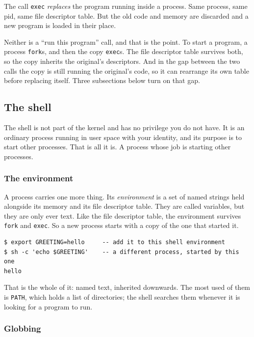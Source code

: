 \documentclass[11pt,a4paper]{article}
\begin{document}
The call \texttt{exec} \emph{replaces} the program running inside a process. Same process, same pid, same
file descriptor table. But the old code and memory are discarded and a new program is loaded in their
place.

Neither is a ``run this program'' call, and that is the point. To start a program, a process
\texttt{fork}s, and then the copy \texttt{exec}s. The file descriptor table survives both, so the copy
inherits the original's descriptors. And in the gap between the two calls the copy is still running
the original's code, so it can rearrange its own table before replacing itself. Three subsections
below turn on that gap.

\subsection{The shell}

The shell is not part of the kernel and has no privilege you do not have. It is an ordinary
process running in user space with your identity, and its purpose is to start other processes. That
is all it is. A process whose job is starting other processes.

\subsubsection{The environment}

A process carries one more thing. Its \emph{environment} is a set of named strings held
alongside its memory and its file descriptor table. They are called variables, but they are only ever
text. Like the file descriptor table, the environment survives \texttt{fork} and \texttt{exec}. So a new
process starts with a copy of the one that started it.

\begin{lstlisting}[language=SH]
$ export GREETING=hello     -- add it to this shell environment
$ sh -c 'echo $GREETING'    -- a different process, started by this one
hello
\end{lstlisting}

That is the whole of it: named text, inherited downwards. The most used of them is
\texttt{PATH}, which holds a list of directories; the shell searches them whenever it is
looking for a program to run.

\subsubsection{Globbing}
\end{document}
